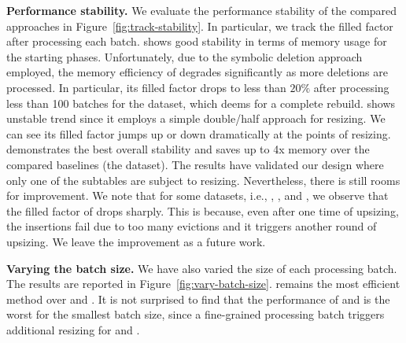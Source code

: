 \vspace{1mm}\noindent\textbf{Performance stability.}
We evaluate the performance stability of the compared approaches in Figure~\ref{fig:track-stability}. 
In particular, we track the filled factor after processing each batch.
\slab shows good stability in terms of memory usage for the starting phases. Unfortunately, due to the symbolic deletion approach employed, the memory efficiency of \slab degrades significantly as more deletions are processed. In particular, its filled factor drops to less than $20\%$ after processing less than 100 batches for the \dsali dataset, which deems for a complete rebuild.
%
\megakv shows unstable trend since it employs a simple double/half approach for resizing. We can see its filled factor jumps up or down dramatically at the points of resizing. \voter demonstrates the best overall stability and saves up to 4x memory over the compared baselines (the \dsali dataset). 
The results have validated our design where only one of the subtables are subject to resizing. 
Nevertheless, there is still rooms for improvement. We note that for some datasets, i.e., \dstwitter, \dsreddit, \dstpch and \dsrandom, we observe that the filled factor of \voter drops sharply.
This is because, even after one time of upsizing, the insertions fail due to too many evictions and it triggers another round of upsizing. We leave the improvement as a future work. 


\vspace{1mm}\noindent\textbf{Varying the batch size.}
We have also varied the size of each processing batch. The results are reported in Figure~\ref{fig:vary-batch-size}. \voter remains the most efficient method over \linear and \megakv. It is not surprised to find that the performance of \linear and \megakv is the worst for the smallest batch size, since a fine-grained processing batch triggers additional resizing for \linear and \megakv. 




